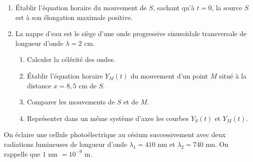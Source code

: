 \documentclass[11pt]{article}
\begin{document}
\begin{enumerate}
  \item Établir l'équation horaire du mouvement de $S$, sachant qu'à $t = 0$, la source $S$ est à son élongation maximale positive.
  \item La nappe d'eau est le siège d'une onde progressive sinusoïdale transversale de longueur d'onde $\lambda = 2$ cm.
  \begin{enumerate}[label=\alph*.]
    \item Calculer la célérité des ondes.
    \item Établir l'équation horaire $Y_M(t)$ du mouvement d'un point $M$ situé à la distance $x = 8{,}5$ cm de $S$.
    \item Comparer les mouvements de $S$ et de $M$.
    \item Représenter dans un même système d'axes les courbes $Y_S(t)$ et $Y_M(t)$.
  \end{enumerate}
\end{enumerate}

On éclaire une cellule photoélectrique au césium successivement avec deux radiations lumineuses de longueur d'onde $\lambda_1 = 410$ nm et $\lambda_2 = 740$ nm. On rappelle que $1$ nm $= 10^{-9}$ m.
\end{document}

